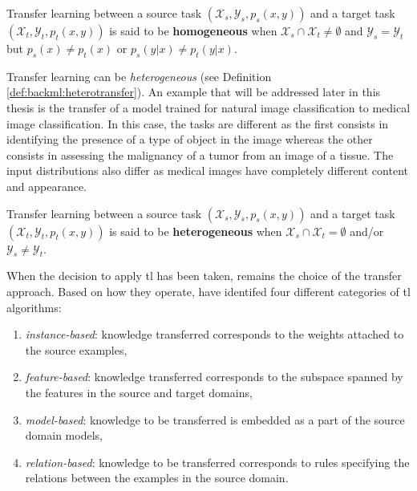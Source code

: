 \begin{definition}
\label{def:backml:homotransfer}
Transfer learning between a source task $\left(\mathcal{X}_{s}, \mathcal{Y}_{s}, p_{s}(x, y)\right)$ and a target task $\left(\mathcal{X}_t, \mathcal{Y}_t, p_t(x, y)\right)$ is said to be \textbf{homogeneous} when $\mathcal{X}_s \cap \mathcal{X}_t \neq \emptyset$ and $\mathcal{Y}_s = \mathcal{Y}_t$ but $p_s(x) \neq p_t(x)$ or $p_s(y|x) \neq p_t(y|x)$. 
\end{definition}

Transfer learning can be \textit{heterogeneous} (see Definition \ref{def:backml:heterotransfer}). An example that will be addressed later in this thesis is the transfer of a model trained for natural image classification to medical image classification. In this case, the tasks are different as the first consists in identifying the presence of a type of object in the image whereas the other consists in assessing the malignancy of a tumor from an image of a tissue. The input distributions also differ as medical images have completely different content and appearance.  

\begin{definition}
\label{def:backml:heterotransfer}
Transfer learning between a source task $\left(\mathcal{X}_{s}, \mathcal{Y}_{s}, p_{s}(x, y)\right)$ and a target task $\left(\mathcal{X}_t, \mathcal{Y}_t, p_t(x, y)\right)$ is said to be \textbf{heterogeneous} when $\mathcal{X}_s \cap \mathcal{X}_t = \emptyset$ and/or $\mathcal{Y}_s \neq \mathcal{Y}_t$.
\end{definition}

When the decision to apply \acrlong{tl} has been taken, remains the choice of the transfer approach. Based on how they operate, \parencite{yang2020transfer} have identifed four different categories of \acrlong{tl} algorithms: 

\begin{enumerate}
  \item \textit{instance-based}: knowledge transferred corresponds to the weights attached to the source examples,
  \item \textit{feature-based}: knowledge transferred corresponds to the subspace spanned by the features in the source and target domains,
  \item \textit{model-based}: knowledge to be transferred is embedded as a part of the source domain models,
  \item \textit{relation-based}: knowledge to be transferred corresponds to rules specifying the relations between the examples in the source domain. 
\end{enumerate}

